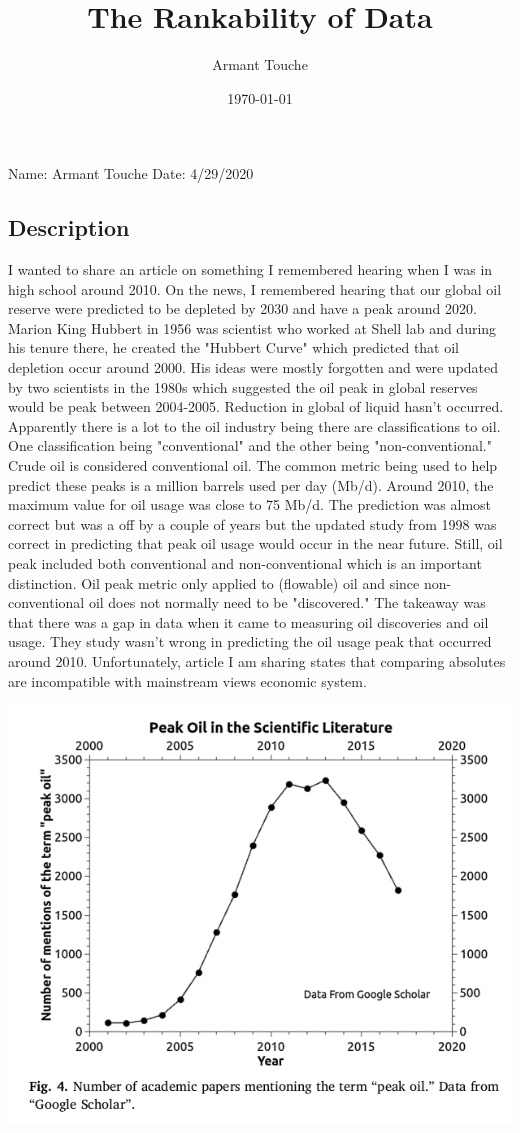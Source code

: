 \documentclass[a4paper,man,biblatex]{apa6}
\title{The Rankability of Data}
\author{Armant Touche}
\affiliation{Portland State University}
\date{\today}
\begin{document}
\thispagestyle{otherpage}
\setcounter{biburllcpenalty}{7000}
\setcounter{biburlucpenalty}{8000}


\noindent Name: Armant Touche\newline
\noindent Date: 4/29/2020

\subsection{Description} I wanted to share an article on something I remembered hearing when I was in high school around 2010. On the news, I remembered hearing that our global oil reserve were predicted to be depleted by 2030 and have a peak around 2020. Marion King Hubbert in 1956 was scientist who worked at Shell lab and during his tenure there, he created the "Hubbert Curve" which predicted that oil depletion occur around 2000. His ideas were mostly forgotten and were updated by two scientists in the 1980s which suggested the oil peak in global reserves would be peak between 2004-2005. Reduction in global of liquid hasn't occurred.  Apparently there is a lot to the oil industry being there are classifications to oil. One classification being "conventional" and the other being "non-conventional." Crude oil is considered conventional oil. The common metric being used to help predict these peaks is a million barrels used per day (Mb/d). Around 2010, the maximum value for oil usage was close to 75 Mb/d. The prediction was almost correct but was a off by a couple of years but the updated study from 1998 was correct in predicting that peak oil usage would occur in the near future. Still, oil peak included both conventional and non-conventional which is an important distinction. Oil peak metric only applied to (flowable) oil and since non-conventional oil does not normally need to be "discovered." The takeaway was that there was a gap in data when it came to measuring oil discoveries and oil usage. They study wasn't wrong in predicting the oil usage peak that occurred around 2010. Unfortunately, article I am sharing states that comparing absolutes are incompatible with mainstream views economic system.

            \begin{center}
            \includegraphics[width=.5\textwidth]{google_data}
            \end{center}
\end{document}

